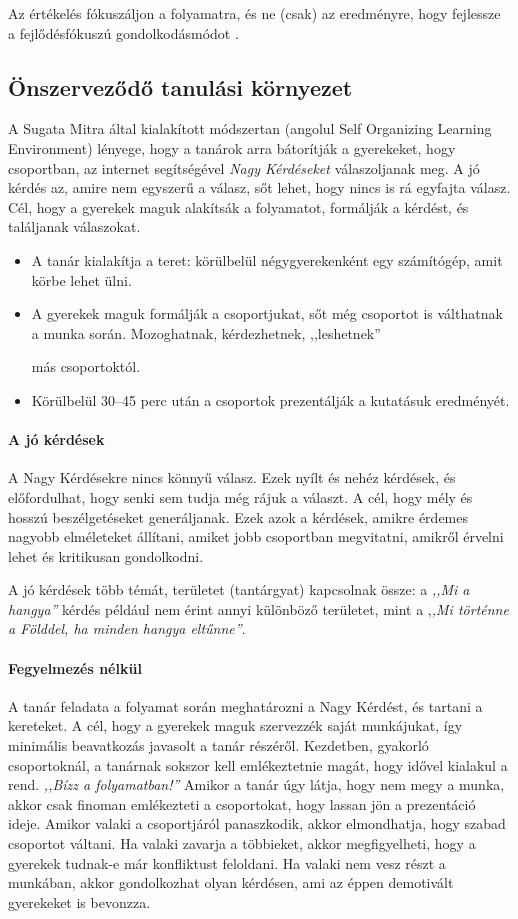 Az értékelés fókuszáljon a folyamatra, és ne (csak)  az eredményre, hogy fejlessze a fejlődésfókuszú gondolkodásmódot \citep{growthmindset}.

\subsection{Önszerveződő tanulási környezet}
A Sugata Mitra által kialakított módszertan (angolul Self Organizing Learning Environment) lényege, hogy a tanárok arra bátorítják a gyerekeket, hogy csoportban, az internet segítségével \emph{Nagy Kérdéseket} válaszoljanak meg. A jó kérdés az, amire nem egyszerű a válasz, sőt lehet, hogy nincs is rá egyfajta válasz. Cél, hogy a gyerekek maguk alakítsák a folyamatot, formálják a kérdést, és találjanak válaszokat.

\begin{itemize}
      \item A tanár kialakítja a teret: körülbelül négygyerekenként egy számítógép, amit körbe lehet ülni.
      \item A gyerekek maguk formálják a csoportjukat, sőt még csoportot is válthatnak a munka során. Mozoghatnak, kérdezhetnek, ,,leshetnek''

            más csoportoktól.
      \item Körülbelül 30--45 perc után a csoportok prezentálják a kutatásuk eredményét.
\end{itemize}

\paragraph{A jó kérdések}
A Nagy Kérdésekre nincs könnyű válasz. Ezek nyílt és nehéz kérdések, és előfordulhat, hogy senki sem tudja még rájuk a választ. A cél, hogy mély és hosszú beszélgetéseket generáljanak. Ezek azok a kérdések, amikre érdemes nagyobb elméleteket állítani, amiket jobb csoportban megvitatni, amikről érvelni lehet és kritikusan gondolkodni.

A jó kérdések több témát, területet (tantárgyat) kapcsolnak össze: a \emph{,,Mi a
      hangya''} kérdés például nem érint annyi különböző területet, mint a ,\emph{,Mi
      történne a Földdel, ha minden hangya eltűnne''}.

\paragraph{Fegyelmezés nélkül}
A tanár feladata a folyamat során meghatározni a Nagy Kérdést, és tartani a kereteket. A cél, hogy a gyerekek maguk szervezzék saját munkájukat, így minimális beavatkozás javasolt a tanár részéről. Kezdetben, gyakorló csoportoknál, a tanárnak sokszor kell emlékeztetnie magát, hogy idővel kialakul a rend. \emph{,,Bízz a
      folyamatban!''
} Amikor a tanár úgy látja, hogy nem megy a munka, akkor csak finoman emlékezteti a csoportokat, hogy lassan jön a prezentáció ideje. Amikor valaki a csoportjáról panaszkodik, akkor elmondhatja, hogy szabad csoportot váltani. Ha valaki zavarja a többieket, akkor megfigyelheti, hogy a gyerekek tudnak-e már konfliktust feloldani. Ha valaki nem vesz részt a munkában, akkor gondolkozhat olyan kérdésen, ami az éppen demotivált gyerekeket is bevonzza.

